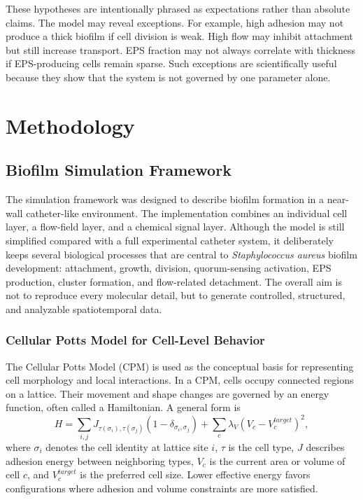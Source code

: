 \documentclass[12pt,a4paper,oneside]{report}
\begin{document}
These hypotheses are intentionally phrased as expectations rather than absolute claims. The model may reveal exceptions. For example, high adhesion may not produce a thick biofilm if cell division is weak. High flow may inhibit attachment but still increase transport. EPS fraction may not always correlate with thickness if EPS-producing cells remain sparse. Such exceptions are scientifically useful because they show that the system is not governed by one parameter alone.

\chapter{Methodology}

\section{Biofilm Simulation Framework}
The simulation framework was designed to describe biofilm formation in a near-wall catheter-like environment. The implementation combines an individual cell layer, a flow-field layer, and a chemical signal layer. Although the model is still simplified compared with a full experimental catheter system, it deliberately keeps several biological processes that are central to \textit{Staphylococcus aureus} biofilm development: attachment, growth, division, quorum-sensing activation, EPS production, cluster formation, and flow-related detachment. The overall aim is not to reproduce every molecular detail, but to generate controlled, structured, and analyzable spatiotemporal data.

\subsection{Cellular Potts Model for Cell-Level Behavior}
The Cellular Potts Model (CPM) is used as the conceptual basis for representing cell morphology and local interactions. In a CPM, cells occupy connected regions on a lattice. Their movement and shape changes are governed by an energy function, often called a Hamiltonian. A general form is
\begin{equation}
H = \sum_{i,j} J_{\tau(\sigma_i),\tau(\sigma_j)}(1-\delta_{\sigma_i,\sigma_j}) + \sum_{c}\lambda_V(V_c-V_c^{target})^2,
\end{equation}
where \(\sigma_i\) denotes the cell identity at lattice site \(i\), \(\tau\) is the cell type, \(J\) describes adhesion energy between neighboring types, \(V_c\) is the current area or volume of cell \(c\), and \(V_c^{target}\) is the preferred cell size. Lower effective energy favors configurations where adhesion and volume constraints are more satisfied.
\end{document}
